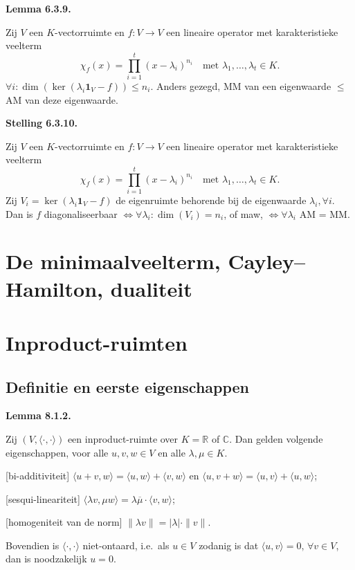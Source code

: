\documentclass[10pt,a4paper]{article}
\newenvironment{res}[2]{%
  \par\noindent\textbf{#1 #2.}%
}{%
  \par\vspace{2pt}\normalfont
}
\renewcommand{\vec}[1]{\mathbf{#1}}
\begin{document}
\begin{res}{Lemma}{6.3.9}
Zij $V$ een $K$-vectorruimte en $f:V\to V$ een lineaire operator met karakteristieke veelterm
\[
\chi_f(x)=\prod_{i=1}^t (x-\lambda_i)^{n_i}\quad\text{met } \lambda_1,\dots,\lambda_t\in K.
\]
$\forall i: \dim(\ker(\lambda_i\vec 1_V-f))\le n_i$. Anders gezegd, MM van een eigenwaarde \(\leq\) AM van deze eigenwaarde.
\end{res}

\begin{res}{Stelling}{6.3.10}
Zij $V$ een $K$-vectorruimte en $f:V\to V$ een lineaire operator met karakteristieke veelterm
\[
\chi_f(x)=\prod_{i=1}^t (x-\lambda_i)^{n_i}\quad\text{met } \lambda_1,\dots,\lambda_t\in K.
\]
Zij $V_i=\ker(\lambda_i\vec 1_V-f)$ de eigenruimte behorende bij de eigenwaarde $\lambda_i, \forall i$.
Dan is $f$ diagonaliseerbaar \(\iff \forall \lambda_i : \dim(V_i)=n_i\), of maw,
 \(\iff \forall \lambda_i\) AM = MM.
\end{res}

\section{De minimaalveelterm, Cayley--Hamilton, dualiteit}


\section{Inproduct-ruimten}
\subsection{Definitie en eerste eigenschappen}
\begin{res}{Lemma}{8.1.2}
Zij $(V,\langle\cdot,\cdot\rangle)$ een inproduct-ruimte over $K=\mathbb R$ of $\mathbb C$. Dan gelden volgende eigenschappen, voor alle $u,v,w\in V$ en alle $\lambda,\mu\in K$.
\begin{myenum}
\item \textup{[bi-additiviteit]} $\langle u+v,w\rangle=\langle u,w\rangle+\langle v,w\rangle$ en $\langle u,v+w\rangle=\langle u,v\rangle+\langle u,w\rangle$;
\item \textup{[sesqui-lineariteit]} $\langle\lambda v,\mu w\rangle=\lambda\overline\mu\cdot\langle v,w\rangle$;
\item \textup{[homogeniteit van de norm]} $\|\lambda v\|=|\lambda|\cdot\|v\|$.
\end{myenum}
Bovendien is $\langle\cdot,\cdot\rangle$ niet-ontaard, i.e.\ als $u\in V$ zodanig is dat $\langle u,v\rangle=0, \,\forall v\in V$, dan is noodzakelijk $u=0$.
\end{res}
\end{document}
